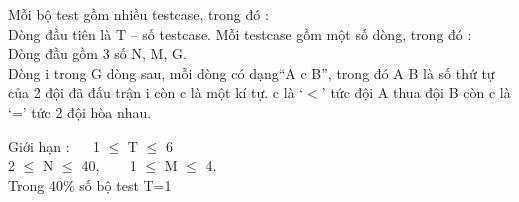 Mỗi bộ test gồm nhiều testcase, trong đó :   \textbf{
\\}   Dòng đầu tiên là T – số testcase. Mỗi testcase gồm một số dòng, trong đó :   
\\   Dòng đầu gồm 3 số N, M, G.   
\\   Dòng i trong G dòng sau, mỗi dòng có dạng“A c B”, trong đó A B là số thứ tự của 2 đội đã đấu trận i còn c là một kí tự. c là ‘$<$’ tức đội A thua đội B còn c là ‘=’ tức 2 đội hòa nhau.  

Giới hạn   :    1 $\le$  T  $\le$  6   
\\   2  $\le$  N  $\le$  40,     1  $\le$  M  $\le$  4.   
\\   Trong 40\% số bộ test T=1